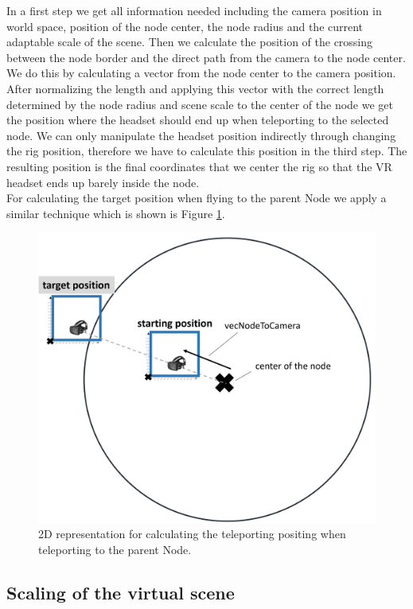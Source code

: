 In a first step we get all information needed including the camera position in world space, position of the node center, the node radius and the current adaptable scale of the scene.
Then we calculate the position of the crossing between the node border and the direct path from the camera to the node center. We do this by calculating a vector from the node center to the camera position. After normalizing the length and applying this vector with the correct length determined by the node radius and scene scale to the center of the node we get the position where the headset should end up when teleporting to the selected node.
We can only manipulate the headset position indirectly through changing the rig position, therefore we have to calculate this position in the third step. 
The resulting position is the final coordinates that we center the rig so that the VR headset ends up barely inside the node.\\
For calculating the target position when flying to the parent Node we apply a similar technique which is shown is Figure \ref{fig:vrFlyToParentNode}.

\begin{figure}[h]
    \centering
    \includegraphics[width=1\textwidth]{graphics/flyToParentNode.jpg}
    \caption{2D representation for calculating the teleporting positing when teleporting to the parent Node.} 
    \label{fig:vrFlyToParentNode} 
\end{figure}

\subsection{Scaling of the virtual scene}
\label{sec:scaling}


